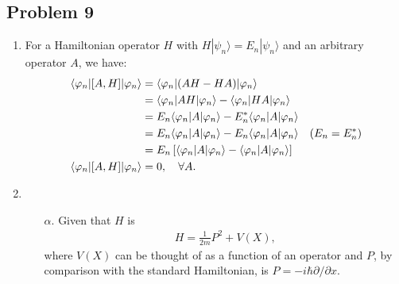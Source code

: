 \documentclass[letterpaper,11pt,twoside]{article}
\newcommand{\ket}[1]{|#1\rangle}
\newcommand{\braket}[1]{\langle#1\rangle}
\begin{document}
\subsection*{Problem 9}
\begin{enumerate}[itemsep=0pt,topsep=0pt,label=\alph*.]
  \item For a Hamiltonian operator $H$ with $H\ket{\psi_n}=E_n\ket{\psi_n}$ and an arbitrary operator $A$, 
  we have:
  \begin{align}
    \braket{\varphi_n|[A,H]|\varphi_n}&=\braket{\varphi_n|(AH-HA)|\varphi_n}\notag\\
    &=\braket{\varphi_n|AH|\varphi_n}-\braket{\varphi_n|HA|\varphi_n}\notag\\
    &=E_n\braket{\varphi_n|A|\varphi_n}-E^*_n\braket{\varphi_n|A|\varphi_n}\notag\\
    &=E_n\braket{\varphi_n|A|\varphi_n}-E_n\braket{\varphi_n|A|\varphi_n}\quad(E_n=E_n^*)\notag\\
    &=E_n\left[\braket{\varphi_n|A|\varphi_n}-\braket{\varphi_n|A|\varphi_n}\right]\notag\\
    \braket{\varphi_n|[A,H]|\varphi_n}&=0,\quad\forall A.\label{eq:commutatormeanvalue}
  \end{align} 
  \item 
  \begin{enumerate}[itemsep=0pt,topsep=0pt]
    \item[$\alpha$.]
    Given that $H$ is 
    \begin{align*}
      H=\frac{1}{2m}P^2+V(X),
    \end{align*}
    where $V(X)$ can be thought of as a function of an operator and $P$, by comparison with the standard Hamiltonian, is $P=-i\hbar\partial/\partial x$.


\end{enumerate}
\end{enumerate}
\end{document}
